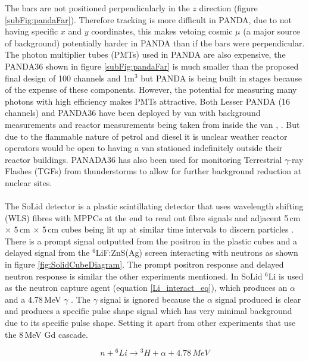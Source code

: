 The bars are not positioned perpendicularly in the $z$ direction (figure \ref{subFig:pandaFar}). Therefore tracking is more difficult in PANDA, due to not having specific $x$ and $y$ coordinates, this makes vetoing cosmic $\mu$ (a major source of background) potentially harder in PANDA than if the bars were perpendicular. The photon multiplier tubes (PMTs) used in PANDA are also expensive, the PANDA36 shown in figure \ref{subFig:pandaFar} is much smaller than the proposed final design of 100 channels and 1m$^3$ \cite{PANDA_2012} but PANDA is being built in stages because of the expense of these components. However, the potential for measuring many photons with high efficiency makes PMTs attractive. Both Lesser PANDA (16 channels) and PANDA36 have been deployed by van with background measurements and reactor measurements being taken from inside the van \cite{PANDA_2012}, \cite{PANDA_2014}. But due to the flammable nature of petrol and diesel it is unclear weather reactor operators would be open to having a van stationed indefinitely outside their reactor buildings. PANADA36 has also been used for monitoring Terrestrial $\gamma$-ray Flashes (TGFs) from thunderstorms to allow for further background reduction at nuclear sites\cite{PANDA_tgf}. 
\\\\The SoLid detector is a plastic scintillating detector that uses wavelength shifting (WLS) fibres with MPPCs at the end to read out fibre signals and adjacent 5\,cm $\times$ 5\,cm $\times$ 5\,cm cubes being lit up at similar time intervals to discern particles \cite{Solid_proposal}. There is a prompt signal outputted from the positron in the plastic cubes and a delayed signal from the $^6$LiF:ZnS(Ag) screen interacting with neutrons as shown in figure \ref{fig:SolidCubeDiagram}. The prompt positron response and delayed neutron response is similar the other experiments mentioned. In SoLid $^6$Li is used as the neutron capture agent (equation \ref{Li_interact_eq}), which produces an $\alpha$ and a 4.78\,MeV $\gamma$ \cite{Solid_readout}. The $\gamma$ signal is ignored because the $\alpha$ signal produced is clear and produces a specific pulse shape signal \cite{Solid_readout} which has very minimal background due to its specific pulse shape. Setting it apart from other experiments that use the 8\,MeV Gd cascade. 

\begin{equation}
n + {^6Li} \rightarrow {^3H} + \alpha +4.78\,MeV
\label{Li_interact_eq}
\end{equation}

